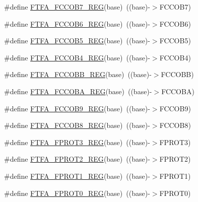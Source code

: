 \begin{DoxyCompactItemize}
\#define \hyperlink{group___f_t_f_a___register___accessor___macros_ga06b43e1caf4d39bdf95eba1e77ffabb0}{F\+T\+F\+A\+\_\+\+F\+C\+C\+O\+B7\+\_\+\+R\+EG}(base)~((base)-\/$>$F\+C\+C\+O\+B7)
\item 
\#define \hyperlink{group___f_t_f_a___register___accessor___macros_ga0ae279e292d8ee8775ca9a56c1e37266}{F\+T\+F\+A\+\_\+\+F\+C\+C\+O\+B6\+\_\+\+R\+EG}(base)~((base)-\/$>$F\+C\+C\+O\+B6)
\item 
\#define \hyperlink{group___f_t_f_a___register___accessor___macros_ga5e53623bfe76199eb2dc25de5721ac94}{F\+T\+F\+A\+\_\+\+F\+C\+C\+O\+B5\+\_\+\+R\+EG}(base)~((base)-\/$>$F\+C\+C\+O\+B5)
\item 
\#define \hyperlink{group___f_t_f_a___register___accessor___macros_ga2bf22b8b463e5f5fc2d0361d00596813}{F\+T\+F\+A\+\_\+\+F\+C\+C\+O\+B4\+\_\+\+R\+EG}(base)~((base)-\/$>$F\+C\+C\+O\+B4)
\item 
\#define \hyperlink{group___f_t_f_a___register___accessor___macros_ga87b3942e4d49cb4679d53aaeb7a1d0c9}{F\+T\+F\+A\+\_\+\+F\+C\+C\+O\+B\+B\+\_\+\+R\+EG}(base)~((base)-\/$>$F\+C\+C\+O\+BB)
\item 
\#define \hyperlink{group___f_t_f_a___register___accessor___macros_ga580068e27c28c3ee347e0f89c73e6d38}{F\+T\+F\+A\+\_\+\+F\+C\+C\+O\+B\+A\+\_\+\+R\+EG}(base)~((base)-\/$>$F\+C\+C\+O\+BA)
\item 
\#define \hyperlink{group___f_t_f_a___register___accessor___macros_gaddf8d17093c5f1472cbd12929f739e83}{F\+T\+F\+A\+\_\+\+F\+C\+C\+O\+B9\+\_\+\+R\+EG}(base)~((base)-\/$>$F\+C\+C\+O\+B9)
\item 
\#define \hyperlink{group___f_t_f_a___register___accessor___macros_ga1c2e5d62119ebc85448dc66ab839f9c0}{F\+T\+F\+A\+\_\+\+F\+C\+C\+O\+B8\+\_\+\+R\+EG}(base)~((base)-\/$>$F\+C\+C\+O\+B8)
\item 
\#define \hyperlink{group___f_t_f_a___register___accessor___macros_ga9ab71b9801803b3de2874a54d96cab14}{F\+T\+F\+A\+\_\+\+F\+P\+R\+O\+T3\+\_\+\+R\+EG}(base)~((base)-\/$>$F\+P\+R\+O\+T3)
\item 
\#define \hyperlink{group___f_t_f_a___register___accessor___macros_ga10f91d56cdb6b3593e774d84f6052875}{F\+T\+F\+A\+\_\+\+F\+P\+R\+O\+T2\+\_\+\+R\+EG}(base)~((base)-\/$>$F\+P\+R\+O\+T2)
\item 
\#define \hyperlink{group___f_t_f_a___register___accessor___macros_ga80a3353ab5eabe7bde5fee5328bdc908}{F\+T\+F\+A\+\_\+\+F\+P\+R\+O\+T1\+\_\+\+R\+EG}(base)~((base)-\/$>$F\+P\+R\+O\+T1)
\item 
\#define \hyperlink{group___f_t_f_a___register___accessor___macros_gae6f345fa6f7defc0912a0dcc9f217dbf}{F\+T\+F\+A\+\_\+\+F\+P\+R\+O\+T0\+\_\+\+R\+EG}(base)~((base)-\/$>$F\+P\+R\+O\+T0)

\end{DoxyCompactItemize}
